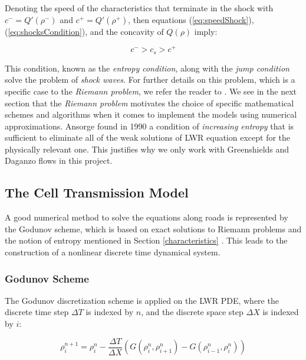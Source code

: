 \documentclass[letterpaper,10pt]{article}
\begin{document}
Denoting the speed of the characteristics that terminate in the shock with $c^{-}=Q'(\rho^{-})$ and $c^{+}=Q'(\rho^{+})$, then equations (\ref{eq:speedShock}), (\ref{eq:shocksCondition}), and the concavity of $Q(\rho)$ imply:

\begin{equation} \label{eq:speedRelation}
c^{-} > c_{s} > c^{+}
\end{equation}

This condition, known as the \textit{entropy condition}, along with the \textit{jump condition} solve the problem of \textit{shock waves}. For further details on this problem, which is a specific case to the \textit{Riemann problem}, we refer the reader to \cite{Garavello2006}. We see in the next section that the \textit{Riemann problem} motivates the choice of specific mathematical schemes and algorithms when it comes to implement the models using numerical approximations.
Ansorge \cite{Ansorge1990} found in 1990 a condition of \textit{increasing entropy} that is sufficient to eliminate all of the weak solutions of LWR equation except for the physically relevant one.  This justifies why we only work with Greenshields and Daganzo flows in this project.

\subsection{The Cell Transmission Model}
A good numerical method to solve the equations along roads is represented by the Godunov scheme, which is based on exact solutions to Riemann problems \cite{Godunov1959} and the notion of entropy mentioned in Section \ref{characteristics} . This leads to the construction of a nonlinear discrete time dynamical system.

\subsubsection{Godunov Scheme}\label{godunov}

The Godunov discretization scheme is applied on the LWR PDE, where the discrete time step $\Delta T$ is indexed by $n$, and the discrete space step $\Delta X$ is indexed by $i$:

\begin{equation} \label{eq:rhoGodunov}
\rho^{n+1}_{i} = \rho^{n}_{i} - \frac{\Delta T}{\Delta X}\left(G(\rho^{n}_{i},\rho^{n}_{i+1})-G(\rho^{n}_{i-1},\rho^{n}_{i})\right)
\end{equation}
\end{document}
